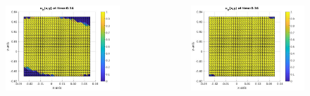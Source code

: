 \documentclass[9pt]{beamer}
\begin{document}
\begin{frame}
\begin{columns}
\begin{column}{0.25\textwidth}
\begin{figure}[h]
				\includegraphics[width=\textwidth]{tc1-2/014.jpg}
			\end{figure}
		\end{column}
		\begin{column}{0.25\textwidth}
			\begin{figure}[h]
				\includegraphics[width=\textwidth]{tc1-2/016.jpg}
			\end{figure}
		\end{column}
	\end{columns}
	\vspace{3mm}
\end{frame}
\end{document}
